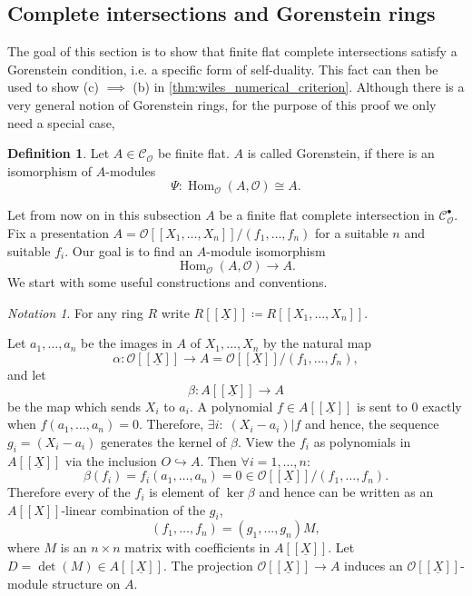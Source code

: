 \documentclass{article}
\theoremstyle{plain}%
\theoremstyle{definition}
\newtheorem{definition}[theorem]{Definition}
\theoremstyle{remark}
\newtheorem*{notation}{Notation}
\newcommand{\cob}{\mathcal{C}_\mathcal{O}^\bullet}
\newcommand{\co}{\mathcal{C}_\mathcal{O}}
\renewcommand{\hom}{\operatorname{Hom}}
\begin{document}
\subsection{Complete intersections and Gorenstein rings}
The goal of this section is to show that finite flat complete intersections
satisfy a Gorenstein condition, i.e. a specific form of self-duality.
This fact can then be used to show (c) \(\implies\) (b) in \cref{thm:wiles_numerical_criterion}.
Although there is a very general notion of Gorenstein rings, for
the purpose of this proof we only need a special case,
\begin{definition}
    Let \(A \in \co\) be finite flat. \(A\) is called Gorenstein, if there is an isomorphism of \(A\)-modules
    \[
        \Psi\colon \hom_\mathcal{O}(A, \mathcal{O}) \cong A.
    \]
\end{definition}
Let from now on in this subsection \(A\) be a finite flat complete intersection in \(\cob\). 
Fix a presentation \(A = \mathcal{O}[[X_1,\dots,X_n]]/(f_1,\dots,f_n)\) for a suitable \(n\)
and suitable \(f_i\).
Our goal is to find an \(A\)-module isomorphism
\[
    \hom_\mathcal{O}(A, \mathcal{O}) \to A.
\]
We start with some useful constructions and conventions.
\begin{notation}
    For any ring \(R\) write \(R[[\underline{X}]] \coloneqq R[[X_1, \dots, X_n]]\).
\end{notation}
Let \(a_1, \dots, a_n\) be the images in \(A\) of \(X_1, \dots, X_n\) by the natural map
\[
    \alpha \colon \mathcal{O}[[\underline{X}]] \to A = \mathcal{O}[[\underline{X}]]/(f_1, \dots, f_n),
\]
and let
\[
    \beta \colon A[[\underline{X}]] \to A  
\]
be the map which sends \(X_i\) to \(a_i\). 
A polynomial \(f \in A[[\underline{X}]]\) is sent to \(0\) exactly when \(f(a_1, \dots, a_n) = 0\).
Therefore, \(\exists i\colon\; (X_i - a_i)|f\) and hence, 
the sequence \(g_i =  (X_i - a_i)\) generates the kernel of \(\beta\).
View the \(f_i\) as polynomials in \(A[[\underline{X}]]\) via the inclusion \(O \hookrightarrow A\). 
Then \(\forall i = 1, \dots, n\colon\)
\[
    \beta(f_i) = f_i(a_1, \dots, a_n) = 0 \in \mathcal{O}[[\underline{X}]]/(f_1, \dots, f_n).
\]
Therefore every of the \(f_i\) is element of \(\ker \beta\) and hence can be written as 
an \(A[[X]]\)-linear combination of the \(g_i\),
\[
    (f_1, \dots, f_n) = (g_1, \dots, g_n)M,  
\]
where \(M\) is an \(n \times n\) matrix with coefficients in \(A[[\underline{X}]]\). 
Let \(D = \det(M) \in A[[\underline{X}]]\).
The projection \(\mathcal{O}[[\underline{X}]] \to A\) induces an \(\mathcal{O}[[\underline{X}]]\)-module 
structure on \(A\).
\end{document}
